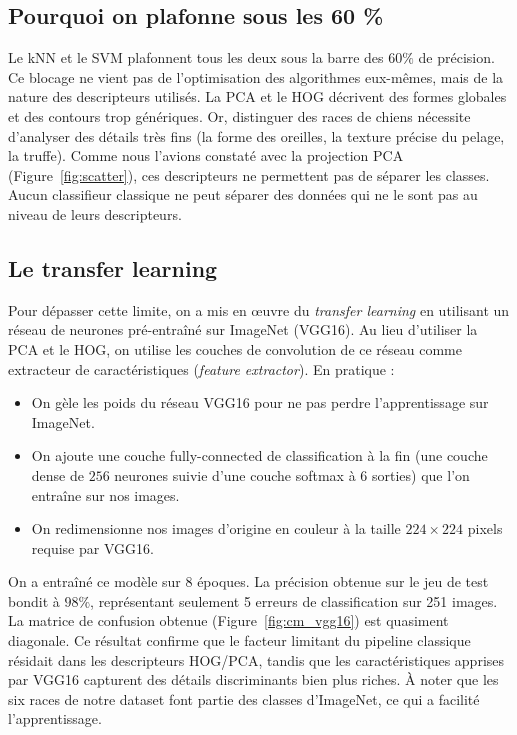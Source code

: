 \documentclass[11pt,a4paper]{article}
\begin{document}
\subsection{Pourquoi on plafonne sous les 60 \%}

Le kNN et le SVM plafonnent tous les deux sous la barre des $60\%$ de précision. Ce blocage ne vient pas de l'optimisation des algorithmes eux-mêmes, mais de la nature des descripteurs utilisés. La PCA et le HOG décrivent des formes globales et des contours trop génériques. Or, distinguer des races de chiens nécessite d'analyser des détails très fins (la forme des oreilles, la texture précise du pelage, la truffe). Comme nous l'avions constaté avec la projection PCA (Figure~\ref{fig:scatter}), ces descripteurs ne permettent pas de séparer les classes. Aucun classifieur classique ne peut séparer des données qui ne le sont pas au niveau de leurs descripteurs.

\subsection{Le transfer learning}

Pour dépasser cette limite, on a mis en œuvre du \textit{transfer learning} en utilisant un réseau de neurones pré-entraîné sur ImageNet (VGG16). Au lieu d'utiliser la PCA et le HOG, on utilise les couches de convolution de ce réseau comme extracteur de caractéristiques (\textit{feature extractor}).
En pratique :
\begin{itemize}
\item On gèle les poids du réseau VGG16 pour ne pas perdre l'apprentissage sur ImageNet.
\item On ajoute une couche fully-connected de classification à la fin (une couche dense de $256$ neurones suivie d'une couche softmax à $6$ sorties) que l'on entraîne sur nos images.
\item On redimensionne nos images d'origine en couleur à la taille $224 \times 224$ pixels requise par VGG16.
\end{itemize}
On a entraîné ce modèle sur 8 époques. La précision obtenue sur le jeu de test bondit à \textbf{$98\%$}, représentant seulement 5 erreurs de classification sur 251 images. La matrice de confusion obtenue (Figure~\ref{fig:cm_vgg16}) est quasiment diagonale. Ce résultat confirme que le facteur limitant du pipeline classique résidait dans les descripteurs HOG/PCA, tandis que les caractéristiques apprises par VGG16 capturent des détails discriminants bien plus riches. À noter que les six races de notre dataset font partie des classes d'ImageNet, ce qui a facilité l'apprentissage.
\end{document}
